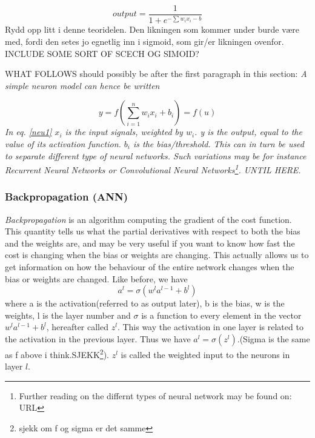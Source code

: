 \documentclass[a4paper,11pt,twocolumn]{article}
\begin{document}
\begin{equation}
output = \frac{1}{1 + e^{-\sum w_ix_i-b}}
\end{equation}
\cite{Nielsen}
Rydd opp litt i denne teoridelen. Den likningen som kommer under burde være med, fordi den setes jo egnetlig inn i sigmoid, som gir/er likningen ovenfor. 
INCLUDE SOME SORT OF SCECH OG SIMOID?


WHAT FOLLOWS should possibly be after the first paragraph in this section:
\textit{ A simple neuron model can hence be written} 

\begin{equation}
y = f(\sum\limits_{i=1}^n w_ix_i + b_i) = f(u)
\label{neu1}
\end{equation}
\cite{slides}
\textit{ In  eq. \eqref{neu1} $x_i$ is the input signals, weighted by $w_i$. y is the output, equal to the value of its activation function. $b_i$ is the bias/threshold. This can in turn be used to separate different type of neural networks. Such variations may be for instance Recurrent Neural Networks or Convolutional Neural Networks\footnote{Further reading on the differnt types of neural network may be found on: URL}. UNTIL HERE.}

\subsubsection{Backpropagation (ANN)}
\textit{Backpropagation} is an algorithm computing the gradient of the cost function. This quantity tells us what the partial derivatives with respect to both the bias and the weights are, and may be very useful if you want to know how fast the cost is changing when the bias or weights are changing. This actually allows us to get information on how the behaviour of the entire network changes when the bias or weights are changed. Like before, we have    
\begin{equation}
a^l = \sigma(w^la^{l-1} + b^l)
\label{al}
\end{equation}
where a is the activation(referred to as output later), b is the bias, w is the weights, l is the layer number and $\sigma$ is a function to every element in the vector $w^la^{l-1}+b^l$, hereafter called $z^l$. This way the activation in one layer is related to the activation in the previous layer. Thus we have $a^l = \sigma(z^l)$.(Sigma is the same as f above i think.SJEKK\footnote{sjekk om f og sigma er det samme}). $z^l$ is called the weighted input to the neurons in layer $l$. 
\\
\end{document}
